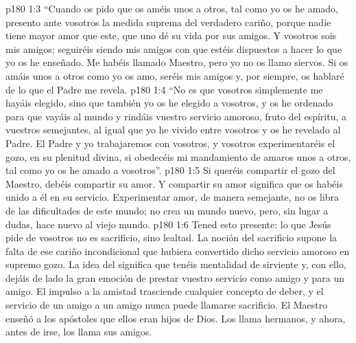 \vs p180 1:3 “Cuando os pido que os améis unos a otros, tal como yo os he amado, presento ante vosotros la medida suprema del verdadero cariño, porque nadie tiene mayor amor que este, que uno dé su vida por sus amigos. Y vosotros sois mis amigos; seguiréis siendo mis amigos con que estéis dispuestos a hacer lo que yo os he enseñado. Me habéis llamado Maestro, pero yo no os llamo siervos. Si os amáis unos a otros como yo os amo, seréis mis amigos y, por siempre, os hablaré de lo que el Padre me revela.
\vs p180 1:4 “No es que vosotros simplemente me hayáis elegido, sino que también yo os he elegido a vosotros, y os he ordenado para que vayáis al mundo y rindáis vuestro servicio amoroso, fruto del espíritu, a vuestros semejantes, al igual que yo he vivido entre vosotros y os he revelado al Padre. El Padre y yo trabajaremos con vosotros, y vosotros experimentaréis el gozo, en su plenitud divina, si obedecéis mi mandamiento de amaros unos a otros, tal como yo os he amado a vosotros”.
\vs p180 1:5 \pc Si queréis compartir el gozo del Maestro, debéis compartir su amor. Y compartir su amor significa que os habéis unido a él en su servicio. Experimentar amor, de manera semejante, no os libra de las dificultades de este mundo; no crea un mundo nuevo, pero, sin lugar a dudas, hace nuevo al viejo mundo.
\vs p180 1:6 Tened esto presente: lo que Jesús pide de vosotros no es sacrificio, sino lealtad. La noción del sacrificio supone la falta de ese cariño incondicional que hubiera convertido dicho servicio amoroso en supremo gozo. La idea del  significa que tenéis mentalidad de sirviente y, con ello, dejáis de lado la gran emoción de prestar vuestro servicio como amigo y para un amigo. El impulso a la amistad trasciende cualquier concepto de deber, y el servicio de un amigo a un amigo nunca puede llamarse sacrificio. El Maestro enseñó a los apóstoles que ellos eran hijos de Dios. Los llama hermanos, y ahora, antes de irse, los llama sus amigos.
